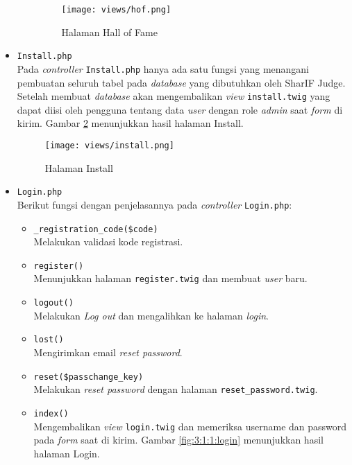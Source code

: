\begin{itemize}
\begin{itemize}
                        \begin{figure}[H]
                              \centering
                              \texttt{[image: views/hof.png]}
                              \caption{Halaman Hall of Fame}
                              \label{fig:3:1:1:hof}
                        \end{figure}

            \end{itemize}

      \item \verb|Install.php| \\
            Pada \textit{controller} \verb|Install.php| hanya ada satu fungsi yang menangani pembuatan seluruh tabel pada \textit{database} yang dibutuhkan oleh SharIF Judge. Setelah membuat \textit{database} akan mengembalikan \textit{view} \verb|install.twig| yang dapat diisi oleh pengguna tentang data \textit{user} dengan role \textit{admin} saat \textit{form} di kirim. Gambar \ref{fig:3:1:1:install} menunjukkan hasil halaman Install.

            \begin{figure}[H]
                  \centering
                  \texttt{[image: views/install.png]}
                  \caption{Halaman Install}
                  \label{fig:3:1:1:install}
            \end{figure}


      \item \verb|Login.php| \\
            Berikut fungsi dengan penjelasannya pada \textit{controller} \verb|Login.php|:

            \begin{itemize}
                  \item \verb|_registration_code($code)| \\
                        Melakukan validasi kode registrasi.
                  \item \verb|register()| \\
                        Menunjukkan halaman \verb|register.twig| dan membuat \textit{user} baru.
                  \item \verb|logout()| \\
                        Melakukan \textit{Log out} dan mengalihkan ke halaman \textit{login}.
                  \item \verb|lost()| \\
                        Mengirimkan email \textit{reset password}.
                  \item \verb|reset($passchange_key)| \\
                        Melakukan \textit{reset password} dengan halaman \verb|reset_password.twig|.
                  \item \verb|index()| \\
                        Mengembalikan \textit{view} \verb|login.twig| dan memeriksa username dan password pada \textit{form} saat di kirim. Gambar \ref{fig:3:1:1:login} menunjukkan hasil halaman Login.


\end{itemize}
\end{itemize}
